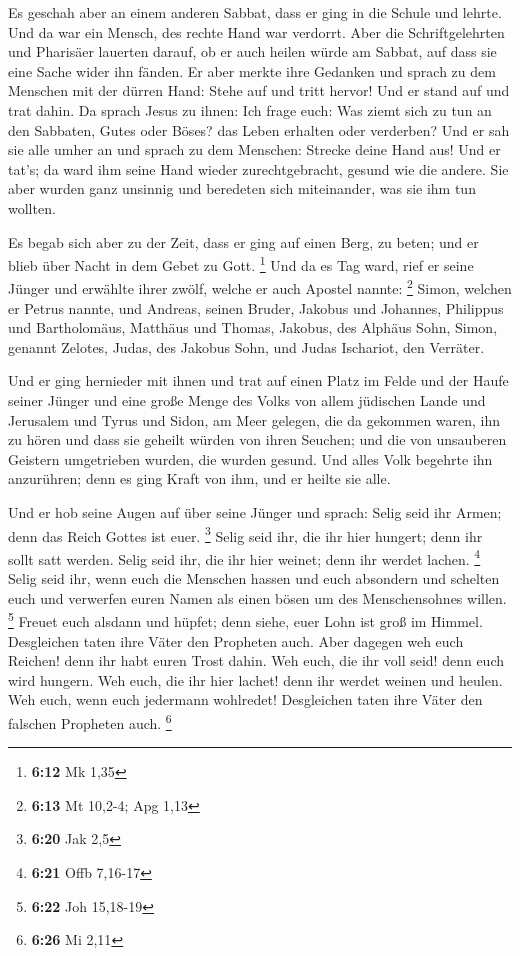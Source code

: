  Es geschah aber an einem anderen Sabbat, dass er ging in
die Schule und lehrte. Und da war ein Mensch, des rechte Hand war
verdorrt.  Aber die Schriftgelehrten und Pharisäer lauerten
darauf, ob er auch heilen würde am Sabbat, auf dass sie eine Sache wider
ihn fänden.  Er aber merkte ihre Gedanken und sprach zu dem
Menschen mit der dürren Hand: Stehe auf und tritt hervor! Und er stand
auf und trat dahin.  Da sprach Jesus zu ihnen: Ich frage
euch: Was ziemt sich zu tun an den Sabbaten, Gutes oder Böses? das Leben
erhalten oder verderben?  Und er sah sie alle umher an und
sprach zu dem Menschen: Strecke deine Hand aus! Und er tat's; da ward
ihm seine Hand wieder zurechtgebracht, gesund wie die andere.
 Sie aber wurden ganz unsinnig und beredeten sich
miteinander, was sie ihm tun wollten.

 Es begab sich aber zu der Zeit, dass er ging auf einen
Berg, zu beten; und er blieb über Nacht in dem Gebet zu Gott.
\footnote{\textbf{6:12} Mk 1,35}  Und da es Tag ward, rief
er seine Jünger und erwählte ihrer zwölf, welche er auch Apostel nannte:
\footnote{\textbf{6:13} Mt 10,2-4; Apg 1,13}  Simon,
welchen er Petrus nannte, und Andreas, seinen Bruder, Jakobus und
Johannes, Philippus und Bartholomäus,  Matthäus und Thomas,
Jakobus, des Alphäus Sohn, Simon, genannt Zelotes,  Judas,
des Jakobus Sohn, und Judas Ischariot, den Verräter.

 Und er ging hernieder mit ihnen und trat auf einen Platz
im Felde und der Haufe seiner Jünger und eine große Menge des Volks von
allem jüdischen Lande und Jerusalem und Tyrus und Sidon, am Meer
gelegen,  die da gekommen waren, ihn zu hören und dass sie
geheilt würden von ihren Seuchen; und die von unsauberen Geistern
umgetrieben wurden, die wurden gesund.  Und alles Volk
begehrte ihn anzurühren; denn es ging Kraft von ihm, und er heilte sie
alle.

 Und er hob seine Augen auf über seine Jünger und sprach:
Selig seid ihr Armen; denn das Reich Gottes ist euer. \footnote{\textbf{6:20}
  Jak 2,5}  Selig seid ihr, die ihr hier hungert; denn ihr
sollt satt werden. Selig seid ihr, die ihr hier weinet; denn ihr werdet
lachen. \footnote{\textbf{6:21} Offb 7,16-17}  Selig seid
ihr, wenn euch die Menschen hassen und euch absondern und schelten euch
und verwerfen euren Namen als einen bösen um des Menschensohnes willen.
\footnote{\textbf{6:22} Joh 15,18-19}  Freuet euch alsdann
und hüpfet; denn siehe, euer Lohn ist groß im Himmel. Desgleichen taten
ihre Väter den Propheten auch.  Aber dagegen weh euch
Reichen! denn ihr habt euren Trost dahin.  Weh euch, die
ihr voll seid! denn euch wird hungern. Weh euch, die ihr hier lachet!
denn ihr werdet weinen und heulen.  Weh euch, wenn euch
jedermann wohlredet! Desgleichen taten ihre Väter den falschen Propheten
auch. \footnote{\textbf{6:26} Mi 2,11}

